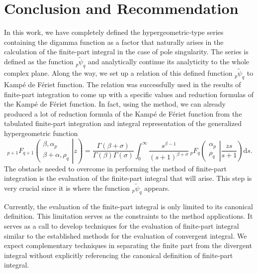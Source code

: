 \chapter{Conclusion and Recommendation}
\label{ch_6}
\hspace{\parindent} 

In this work, we have completely defined the hypergeometric-type series containing the digamma function as a factor that naturally arises in the calculation of the finite-part integral in the case of pole singularity. The series is defined as the function ${}_p\tilde{\psi}_q$ and analytically continue its analyticity to the whole complex plane. Along the way, we set up a relation of this defined function ${}_p\tilde{\psi}_q$ to Kampé de Fériet function. The relation was successfully used in the results of finite-part integration to come up with a specific values and reduction formulas of the Kampé de Fériet function. In fact, using the method, we can already produced a lot of reduction formula of the Kampé de Fériet function from the tabulated finite-part integration and integral representation of the generalized hypergeometric function
\begin{equation}\label{general}
\, _{p+1}F_{q+1}\!\left.\left(\begin{array}{c}
\beta,\alpha_p\\
\beta+\alpha,\rho_q
\end{array}\right|z\right) = \frac{\Gamma(\beta+\sigma)}{\Gamma(\beta)\Gamma(\sigma)} \int_0^{\infty} \frac{s^{\beta-1}}{(s+1)^{\beta+\sigma}} \, _{p}F_{q}\!\left.\left(\begin{array}{c}
\alpha_p\\
\rho_q
\end{array}\right|\frac{z s}{s+1}\right)\mathrm{d}s .
\end{equation}
The obstacle needed to overcome in performing the method of finite-part integration is the evaluation of the finite-part integral that will arise. This step is very crucial since it is where the function ${}_p\tilde{\psi}_q$ appears. 

Currently, the evaluation of the finite-part integral is only limited to its canonical definition. This limitation serves as the constraints to the method applications. It serves as a call to develop techniques for the evaluation of finite-part integral similar to the established methods for the evaluation of convergent integral.  We expect complementary techniques in separating the finite part from the divergent integral without explicitly referencing the canonical definition of finite-part integral. 
